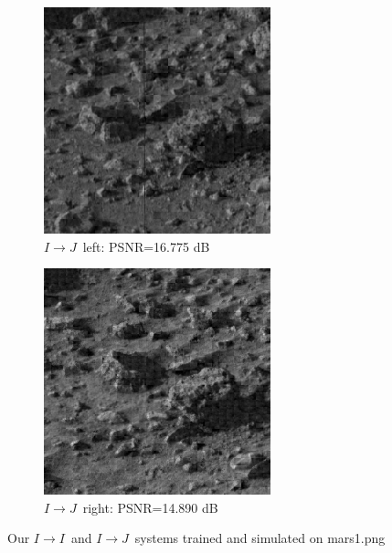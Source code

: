 \documentclass[10pt,twoside,titlepage]{article}
\newcommand{\sysII}{\mbox{$I \rightarrow I$}}
\newcommand{\sysIJ}{\mbox{$I \rightarrow J$}}
\begin{document}
\begin{figure}
    \centering
    \begin{subfigure}{0.5\textwidth}
        \centering
        \includegraphics[width=0.6\linewidth]{img/mars1_ij_left.png}
        \caption{\sysIJ\ left: PSNR=16.775 dB}
    \end{subfigure}%
    \begin{subfigure}{0.5\textwidth}
        \centering
        \includegraphics[width=0.6\linewidth]{img/mars1_ij_right.png}
        \caption{\sysIJ\ right: PSNR=14.890 dB}
    \end{subfigure}
    \label{fig:mars1_ij}

    \caption{Our \sysII\ and \sysIJ\ systems trained and simulated on mars1.png}
    \label{fig:mars1_results}
\end{figure}
\end{document}
